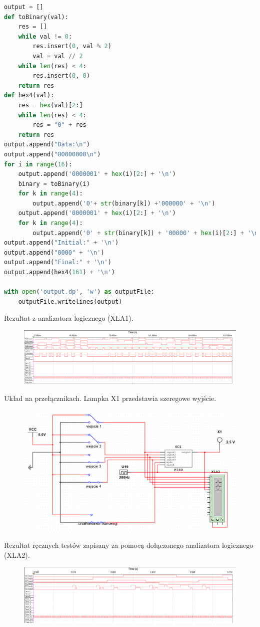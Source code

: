 \documentclass{article}
\begin{document}
\begin{lstlisting}[language = Python]
output = []
def toBinary(val):
    res = []
    while val != 0:
        res.insert(0, val % 2)
        val = val // 2
    while len(res) < 4:
        res.insert(0, 0)
    return res
def hex4(val):
    res = hex(val)[2:]
    while len(res) < 4:
        res = "0" + res
    return res
output.append("Data:\n")
output.append("80000000\n")
for i in range(16):
    output.append('0000001' + hex(i)[2:] + '\n')
    binary = toBinary(i)
    for k in range(4):
        output.append('0'+ str(binary[k]) +'000000' + '\n')
    output.append('0000001' + hex(i)[2:] + '\n')
    for k in range(4):
        output.append('0' + str(binary[k]) + '00000' + hex(i)[2:] + '\n')
output.append("Initial:" + '\n')
output.append("0000" + '\n')
output.append("Final:" + '\n')
output.append(hex4(161) + '\n')

with open('output.dp', 'w') as outputFile:
    outputFile.writelines(output)
\end{lstlisting}
Rezultat z analizatora logicznego (XLA1).
\begin{figure}[H]
\includegraphics[width = \textwidth]{analyzerTesty_1}
\end{figure}
Układ na przełącznikach. Lampka X1 przedstawia szeregowe wyjście.
\begin{figure}[H]
\includegraphics[width = \textwidth]{ulad2b_2}
\end{figure}
Rezultat ręcznych testów zapisany za pomocą dołączonego analizatora logicznego (XLA2).
\begin{figure}[H]
\includegraphics[width = \textwidth]{analyzerTesty_2}
\end{figure}
\end{document}
